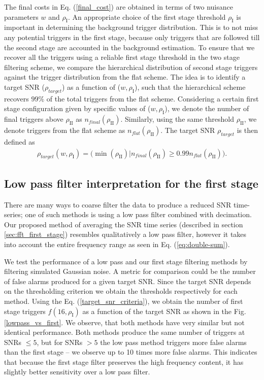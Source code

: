 The final costs in Eq. (\ref{final_cost}) are obtained in terms of two nuisance parameters $w$ and $\rho_{\text{I}}$. An appropriate choice of the first stage threshold $\rho_{\text{I}}$ is important in determining the background trigger distribution. This is to not miss any potential triggers in the first stage, because only triggers that are followed till the second stage are accounted in the background estimation. To ensure that we recover all the triggers using a reliable first stage threshold in the two stage filtering scheme, we compare the hierarchical distribution of second stage triggers against the trigger distribution from the flat scheme. The idea is to identify a target SNR ($\rho_{target}$) as a function of ($w, \rho_{\text{I}}$), such that the hierarchical scheme recovers $99\%$ of the total triggers from the flat scheme. Considering a certain first stage configuration given by specific values of ($w, \rho_{\text{I}}$), we denote the number of final triggers above $\rho_{\text{II}}$ as $n_{final}(\rho_{\text{II}})$. Similarly, using the same threshold $\rho_{\text{II}}$, we denote triggers from the flat scheme as $n_{flat}(\rho_{\text{II}})$.
The target SNR $\rho_{target}$ is then defined as
\begin{align}
\label{target_snr_criteria}
    \rho_{target}(w, \rho_{\text{I}}) = \Big(\min (\rho_{\text{II}}) \Big| n_{final}(\rho_{\text{II}}) \geq 0.99 n_{flat}(\rho_{\text{II}}) \Big).
\end{align}



\subsection{Low pass filter interpretation for the first stage}
There are many ways to coarse filter the data to produce a reduced SNR time-series; one of such methods is using a low pass filter combined with decimation. Our proposed method of averaging the SNR time series (described in section \ref{sec:fft_first_stage}) resembles qualitatively a low pass filter, however it takes into account the entire frequency range as seen in Eq. (\ref{eq:double-sum}). 

We test the performance of a low pass and our first stage filtering methods by filtering simulated Gaussian noise. A metric for comparison could be the number of false alarms produced for a given target SNR. Since the target SNR depends on the thresholding criterion we obtain the thresholds respectively for each method. Using the Eq. (\ref{target_snr_criteria}), we obtain the number of first stage triggers $f(16, \rho_{\text{I}})$ as a function of the target SNR as shown in the Fig. \ref{lowpass_vs_first}. We observe, that both methods have very similar but not identical performance. Both methods produce the same number of triggers at SNRs $\leq 5$, but for SNRs $> 5$ the low pass method triggers more false alarms than the first stage -- we observe up to 10 times more false alarms. This indicates that because the first stage filter preserves the high frequency content, it has slightly better sensitivity over a low pass filter.

